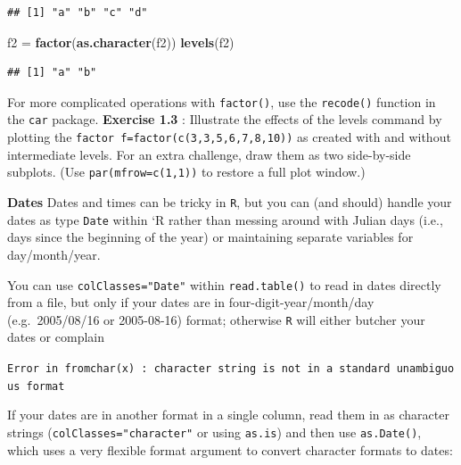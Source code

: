 \documentclass[11pt,]{article}
\newenvironment{Shaded}{\begin{snugshade}}{\end{snugshade}}
\newcommand{\KeywordTok}[1]{\textcolor[rgb]{0.13,0.29,0.53}{\textbf{#1}}}
\newcommand{\DataTypeTok}[1]{\textcolor[rgb]{0.13,0.29,0.53}{#1}}
\newcommand{\StringTok}[1]{\textcolor[rgb]{0.31,0.60,0.02}{#1}}
\newcommand{\NormalTok}[1]{#1}
\begin{document}
\begin{verbatim}
## [1] "a" "b" "c" "d"
\end{verbatim}

\begin{Shaded}
\begin{Highlighting}[]
\NormalTok{f2 =}\StringTok{ }\KeywordTok{factor}\NormalTok{(}\KeywordTok{as.character}\NormalTok{(f2))}
\KeywordTok{levels}\NormalTok{(f2)}
\end{Highlighting}
\end{Shaded}

\begin{verbatim}
## [1] "a" "b"
\end{verbatim}

For more complicated operations with \texttt{factor()}, use the
\texttt{recode()} function in the \texttt{car} package. \textbf{Exercise
1.3} : Illustrate the effects of the levels command by plotting the
\texttt{factor\ f=factor(c(3,3,5,6,7,8,10))} as created with and without
intermediate levels. For an extra challenge, draw them as two
side-by-side subplots. (Use \texttt{par(mfrow=c(1,1))} to restore a full
plot window.)

\textbf{Dates} Dates and times can be tricky in \texttt{R}, but you can
(and should) handle your dates as type \texttt{Date} within `R rather
than messing around with Julian days (i.e., days since the beginning of
the year) or maintaining separate variables for day/month/year.

You can use \texttt{colClasses="Date"} within \texttt{read.table()} to
read in dates directly from a file, but only if your dates are in
four-digit-year/month/day (e.g.~2005/08/16 or 2005-08-16) format;
otherwise \texttt{R} will either butcher your dates or complain

\texttt{Error\ in\ fromchar(x)\ :\ character\ string\ is\ not\ in\ a\ standard\ unambiguous\ format}

If your dates are in another format in a single column, read them in as
character strings (\texttt{colClasses="character"} or using
\texttt{as.is}) and then use \texttt{as.Date()}, which uses a very
flexible format argument to convert character formats to dates:

\begin{Shaded}
\end{Shaded}
\end{document}
